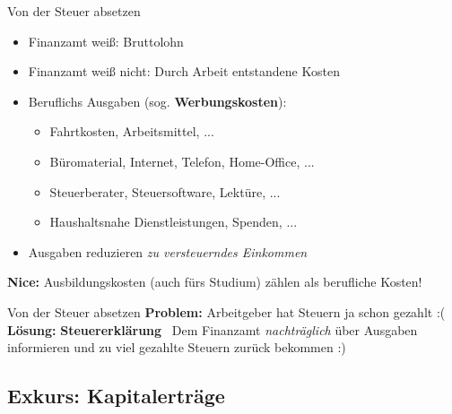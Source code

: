 \documentclass{beamer}
\begin{document}
			\begin{frame}{Von der Steuer absetzen}
				\begin{itemize}
					\item Finanzamt weiß: Bruttolohn
					\item Finanzamt weiß nicht: Durch Arbeit entstandene Kosten
					\pause
					\item Beruflichs Ausgaben (sog. \textbf{Werbungskosten}):
					\begin{itemize}
						\item Fahrtkosten, Arbeitsmittel, ...
						\item Büromaterial, Internet, Telefon, Home-Office, ...
						\item Steuerberater, Steuersoftware, Lektüre, ...
						\item Haushaltsnahe Dienstleistungen, Spenden, ...
					\end{itemize}
					\item Ausgaben reduzieren \textit{zu versteuerndes Einkommen}
				\end{itemize}\n\pause
				
				\textbf{Nice:} Ausbildungskosten (auch fürs Studium) zählen als berufliche Kosten!
			\end{frame}
				
			\begin{frame}{Von der Steuer absetzen}
				\textbf{Problem:} Arbeitgeber hat Steuern ja schon gezahlt :(\n\pause
				\textbf{Lösung:} \textbf{Steuererklärung} \textrightarrow\ Dem Finanzamt \textit{nachträglich} über Ausgaben informieren und zu viel gezahlte Steuern zurück bekommen :)
			\end{frame}
		
		\subsection{Exkurs: Kapitalerträge}
		
\end{document}
